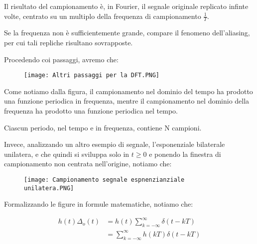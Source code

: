 Il risultato del campionamento è, in Fourier, il segnale originale replicato infinte volte, centrato su un multiplo della frequenza di campionamento $\frac{1}{T}$. \newline 

Se la frequenza non è sufficientemente grande, compare il fenomeno dell'aliasing, per cui tali repliche risultano sovrapposte. \newline 

Procedendo coi passaggi, avremo che: 

\begin{figure}[h]
    \centering
    \texttt{[image: Altri passaggi per la DFT.PNG]}
\end{figure} 

\newpage 

Come notiamo dalla figura, il campionamento nel dominio del tempo ha prodotto una funzione periodica in frequenza, 
mentre il campionamento nel dominio della frequenza ha prodotto una funzione periodica nel tempo. \newline 

Ciascun periodo, nel tempo e in frequenza, contiene N campioni. \newline 

\newpage 

Invece, analizzando un altro esempio di segnale, l'esponenziale bilaterale unilatera, e che quindi si sviluppa solo in $t \geq 0$ 
e ponendo la finestra di campionamento non centrata nell'origine, notiamo che: 

\begin{figure}[h]
    \centering
    \texttt{[image: Campionamento segnale espnenzianziale unilatera.PNG]}
\end{figure} 

\newpage

Formalizzando le figure in formule matematiche, notiamo che: 

{
    \Large 
    \begin{equation}
        \begin{split}
            h(t) \Delta_o (t) 
            &= 
            h(t) 
            \sum_{k = - \infty}^{\infty} 
            \delta (t - kT) 
            \\ 
            &= 
            \sum_{k = - \infty}^{\infty}
            h(kT) 
            \delta (t - kT)
        \end{split}
    \end{equation}
}

